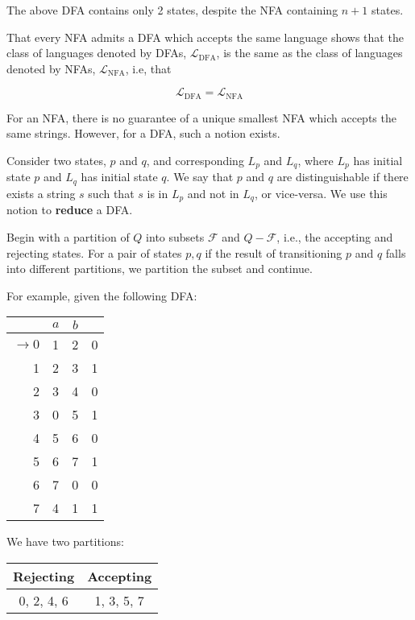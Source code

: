The above DFA contains only 2 states, despite the NFA containing \(n+1\) states.

That every NFA admits a DFA which accepts the same language shows that the class of languages denoted by DFAs, \(\mathcal{L}_{\text{DFA}}\), is the same as the class of languages denoted by NFAs, \(\mathcal{L}_{\text{NFA}}\), i.e, that

\[\mathcal{L}_{\text{DFA}} = \mathcal{L}_{\text{NFA}}\]

For an NFA, there is no guarantee of a unique smallest NFA which accepts the same strings. However, for a DFA, such a notion exists.

Consider two states, \(p\) and \(q\), and corresponding \(L_p\) and \(L_q\), where \(L_p\) has initial state \(p\) and \(L_q\) has initial state \(q\). We say that \(p\) and \(q\) are distinguishable if there exists a string \(s\) such that \(s\) is in \(L_p\) and not in \(L_q\), or vice-versa. We use this notion to \textbf{reduce} a DFA\@.

Begin with a partition of \(Q\) into subsets \(\mathcal{F}\) and \(Q-\mathcal{F}\), i.e., the accepting and rejecting states. For a pair of states \(p, q\) if the result of transitioning \(p\) and \(q\) falls into different partitions, we partition the subset and continue.

For example, given the following DFA\@:

\begin{center}\begin{tabular}{r c c r}
         & \(a\) & \(b\) & \\\bottomrule
         \(\to 0\) & 1 & 2 & 0\\
               1 & 2 & 3 & 1\\
               2 & 3 & 4 & 0\\
               3 & 0 & 5 & 1\\
               4 & 5 & 6 & 0\\
               5 & 6 & 7 & 1\\
               6 & 7 & 0 & 0\\
               7 & 4 & 1 & 1
    \end{tabular}\end{center}

We have two partitions:

\begin{center}\begin{tabular}{c c c c c c c c}
\multicolumn{4}{c|}{Rejecting} & \multicolumn{4}{|c}{Accepting}\\\bottomrule
\multicolumn{4}{c|}{0, 2, 4, 6} & \multicolumn{4}{|c}{1, 3, 5, 7}
\end{tabular}\end{center}

